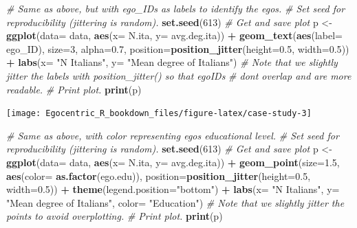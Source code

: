 \documentclass[
]{book}
\newenvironment{Shaded}{\begin{snugshade}}{\end{snugshade}}
\newcommand{\AttributeTok}[1]{\textcolor[rgb]{0.13,0.29,0.53}{#1}}
\newcommand{\CommentTok}[1]{\textcolor[rgb]{0.56,0.35,0.01}{\textit{#1}}}
\newcommand{\DecValTok}[1]{\textcolor[rgb]{0.00,0.00,0.81}{#1}}
\newcommand{\FloatTok}[1]{\textcolor[rgb]{0.00,0.00,0.81}{#1}}
\newcommand{\FunctionTok}[1]{\textcolor[rgb]{0.13,0.29,0.53}{\textbf{#1}}}
\newcommand{\NormalTok}[1]{#1}
\newcommand{\OtherTok}[1]{\textcolor[rgb]{0.56,0.35,0.01}{#1}}
\newcommand{\SpecialCharTok}[1]{\textcolor[rgb]{0.81,0.36,0.00}{\textbf{#1}}}
\newcommand{\StringTok}[1]{\textcolor[rgb]{0.31,0.60,0.02}{#1}}
\begin{document}
\begin{Shaded}
\begin{Highlighting}[]
\CommentTok{\# Same as above, but with ego\_IDs as labels to identify the egos.}
\CommentTok{\# Set seed for reproducibility (jittering is random).}
\FunctionTok{set.seed}\NormalTok{(}\DecValTok{613}\NormalTok{)}
\CommentTok{\# Get and save plot}
\NormalTok{p }\OtherTok{\textless{}{-}} \FunctionTok{ggplot}\NormalTok{(}\AttributeTok{data=}\NormalTok{ data, }\FunctionTok{aes}\NormalTok{(}\AttributeTok{x=}\NormalTok{ N.ita, }\AttributeTok{y=}\NormalTok{ avg.deg.ita)) }\SpecialCharTok{+} 
  \FunctionTok{geom\_text}\NormalTok{(}\FunctionTok{aes}\NormalTok{(}\AttributeTok{label=}\NormalTok{ ego\_ID), }\AttributeTok{size=}\DecValTok{3}\NormalTok{, }\AttributeTok{alpha=}\FloatTok{0.7}\NormalTok{, }
            \AttributeTok{position=}\FunctionTok{position\_jitter}\NormalTok{(}\AttributeTok{height=}\FloatTok{0.5}\NormalTok{, }\AttributeTok{width=}\FloatTok{0.5}\NormalTok{)) }\SpecialCharTok{+} 
  \FunctionTok{labs}\NormalTok{(}\AttributeTok{x=} \StringTok{"N Italians"}\NormalTok{, }\AttributeTok{y=} \StringTok{"Mean degree of Italians"}\NormalTok{)}
\CommentTok{\# Note that we slightly jitter the labels with position\_jitter() so that egoIDs}
\CommentTok{\# don\textquotesingle{}t overlap and are more readable.}
\CommentTok{\# Print plot.}
\FunctionTok{print}\NormalTok{(p)}
\end{Highlighting}
\end{Shaded}

\texttt{[image: Egocentric\_R\_bookdown\_files/figure-latex/case-study-3]}

\begin{Shaded}
\begin{Highlighting}[]
\CommentTok{\# Same as above, with color representing ego\textquotesingle{}s educational level.}
\CommentTok{\# Set seed for reproducibility (jittering is random).}
\FunctionTok{set.seed}\NormalTok{(}\DecValTok{613}\NormalTok{)}
\CommentTok{\# Get and save plot}
\NormalTok{p }\OtherTok{\textless{}{-}} \FunctionTok{ggplot}\NormalTok{(}\AttributeTok{data=}\NormalTok{ data, }\FunctionTok{aes}\NormalTok{(}\AttributeTok{x=}\NormalTok{ N.ita, }\AttributeTok{y=}\NormalTok{ avg.deg.ita)) }\SpecialCharTok{+} 
  \FunctionTok{geom\_point}\NormalTok{(}\AttributeTok{size=}\FloatTok{1.5}\NormalTok{, }\FunctionTok{aes}\NormalTok{(}\AttributeTok{color=} \FunctionTok{as.factor}\NormalTok{(ego.edu)), }
             \AttributeTok{position=}\FunctionTok{position\_jitter}\NormalTok{(}\AttributeTok{height=}\FloatTok{0.5}\NormalTok{, }\AttributeTok{width=}\FloatTok{0.5}\NormalTok{)) }\SpecialCharTok{+} 
  \FunctionTok{theme}\NormalTok{(}\AttributeTok{legend.position=}\StringTok{"bottom"}\NormalTok{) }\SpecialCharTok{+} 
  \FunctionTok{labs}\NormalTok{(}\AttributeTok{x=} \StringTok{"N Italians"}\NormalTok{, }\AttributeTok{y=} \StringTok{"Mean degree of Italians"}\NormalTok{, }\AttributeTok{color=} \StringTok{"Education"}\NormalTok{)}
\CommentTok{\# Note that we slightly jitter the points to avoid overplotting.}
\CommentTok{\# Print plot.}
\FunctionTok{print}\NormalTok{(p)}
\end{Highlighting}
\end{Shaded}
\end{document}
